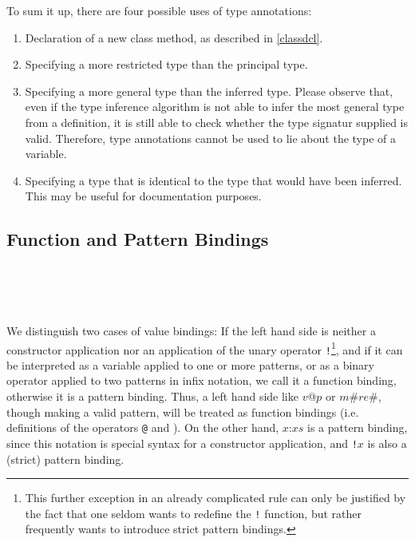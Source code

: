 To sum it up, there are four possible uses of type annotations:
\begin{enumerate}
\item Declaration of a new class method, as described in \autoref{classdcl}.
\item Specifying a more restricted type than the principal type.
\item Specifying a more general type than the inferred type. Please observe that, even if the type inference algorithm is not able to infer the most general type from a definition, it is still able to check whether the type signatur supplied is valid. Therefore, type annotations cannot be used to lie about the type of a variable.
\item Specifying a type that is identical to the type that would have been inferred. This may be useful for documentation purposes.
\end{enumerate}


\subsection{Function and Pattern Bindings} \label{binding}

\begin{flushleft}
  \\
  \oder{} \\
  
  \alt {}  \\
 \sym{=}  
  \alt {}   
\end{flushleft}

We distinguish two cases of value bindings: If the left hand side is neither a constructor application nor an application of the unary operator \texttt{!}\footnote{This further exception in an already complicated rule can only be justified by the fact that one seldom wants to redefine the \texttt{!} function, but rather frequently wants to introduce strict pattern bindings.}, and if it can be interpreted as a variable applied to one or more patterns, or as a binary operator applied to two patterns in infix notation, we call it a function binding, otherwise it is a pattern binding. Thus, a left hand side like $v$@$p$ or $m$\#$re$\#, though making a valid pattern, will be treated as function bindings (i.e. definitions of the operators \texttt{@} and \texttt{}). On the other hand, $x$:$xs$ is a pattern binding, since this notation is special syntax for a constructor application, and \texttt{!}$x$ is also a (strict) pattern binding.

